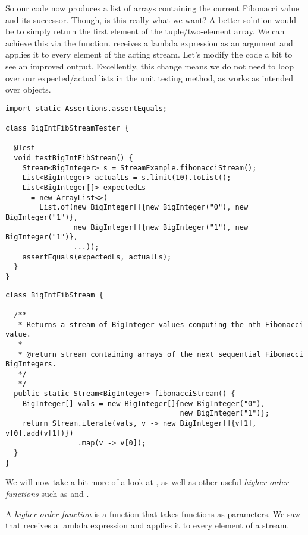 So our code now produces a list of  arrays containing the current Fibonacci value and its successor. Though, is this really what we want? A better solution would be to simply return the first element of the tuple/two-element array. We can achieve this via the  function.  receives a lambda expression as an argument and applies it to every element of the acting stream. Let's modify the code a bit to see an improved output. Excellently, this change means we do not need to loop over our expected/actual lists in the unit testing method, as  works as intended over  objects.

\begin{cl}[]{}
\begin{lstlisting}[language=MyJava]
import static Assertions.assertEquals;

class BigIntFibStreamTester {

  @Test
  void testBigIntFibStream() {
    Stream<BigInteger> s = StreamExample.fibonacciStream();
    List<BigInteger> actualLs = s.limit(10).toList();
    List<BigInteger[]> expectedLs 
      = new ArrayList<>(
        List.of(new BigInteger[]{new BigInteger("0"), new BigInteger("1")},
                new BigInteger[]{new BigInteger("1"), new BigInteger("1")},
                ...));
    assertEquals(expectedLs, actualLs);
  }
}
\end{lstlisting}
\end{cl}

\begin{cl}[]{}
\begin{lstlisting}[language=MyJava]
class BigIntFibStream {

  /**
   * Returns a stream of BigInteger values computing the nth Fibonacci value.
   *
   * @return stream containing arrays of the next sequential Fibonacci BigIntegers.
   */
   */
  public static Stream<BigInteger> fibonacciStream() {
    BigInteger[] vals = new BigInteger[]{new BigInteger("0"),
                                         new BigInteger("1")};
    return Stream.iterate(vals, v -> new BigInteger[]{v[1], v[0].add(v[1])})
                 .map(v -> v[0]);
  }
}
\end{lstlisting}
\end{cl}

We will now take a bit more of a look at , as well as other useful \textit{higher-order functions} such as  and .

A \textit{higher-order function} is a function that takes functions as parameters. We saw that  receives a lambda expression and applies it to every element of a stream. 

